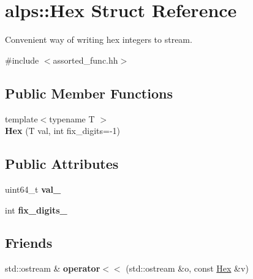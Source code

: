 \hypertarget{structalps_1_1Hex}{}\section{alps\+:\+:Hex Struct Reference}
\label{structalps_1_1Hex}


Convenient way of writing hex integers to stream.  




{\ttfamily \#include $<$assorted\+\_\+func.\+hh$>$}

\subsection*{Public Member Functions}
\begin{DoxyCompactItemize}
\item 
{\footnotesize template$<$typename T $>$ }\\{\bfseries Hex} (T val, int fix\+\_\+digits=-\/1)\hypertarget{structalps_1_1Hex_ae91734bbb2e7af06b66bdff364ad0c95}{}\label{structalps_1_1Hex_ae91734bbb2e7af06b66bdff364ad0c95}

\end{DoxyCompactItemize}
\subsection*{Public Attributes}
\begin{DoxyCompactItemize}
\item 
uint64\+\_\+t {\bfseries val\+\_\+}\hypertarget{structalps_1_1Hex_a6ddf3a48e9e049b8b4ec4ac5a103cce0}{}\label{structalps_1_1Hex_a6ddf3a48e9e049b8b4ec4ac5a103cce0}

\item 
int {\bfseries fix\+\_\+digits\+\_\+}\hypertarget{structalps_1_1Hex_a6a4b41c69846b38cf8d5a5a46c593a04}{}\label{structalps_1_1Hex_a6a4b41c69846b38cf8d5a5a46c593a04}

\end{DoxyCompactItemize}
\subsection*{Friends}
\begin{DoxyCompactItemize}
\item 
std\+::ostream \& {\bfseries operator$<$$<$} (std\+::ostream \&o, const \hyperlink{structalps_1_1Hex}{Hex} \&v)\hypertarget{structalps_1_1Hex_a6acdff21ed9b4ee3996f6d6297e0a63a}{}\label{structalps_1_1Hex_a6acdff21ed9b4ee3996f6d6297e0a63a}

\end{DoxyCompactItemize}


